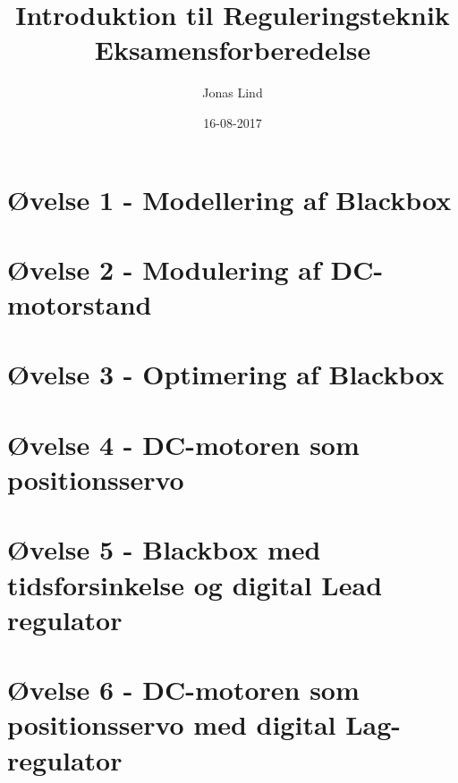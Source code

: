 \documentclass[danish]{article}
\begin{document}
\title{\textbf{ Introduktion til Reguleringsteknik }    Eksamensforberedelse}
\author{Jonas Lind}
\date{16-08-2017}
\maketitle

\section{Øvelse 1 - Modellering af Blackbox}

\section{Øvelse 2 -	Modulering af DC-motorstand}

\section{Øvelse 3 - Optimering af Blackbox}

\section{Øvelse 4 - DC-motoren som positionsservo}

\section{Øvelse 5 - Blackbox med tidsforsinkelse og digital Lead regulator}

\section{Øvelse 6 - DC-motoren som positionsservo med digital Lag- regulator}
\end{document}
